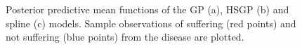 \documentclass[onecolumn,a4paper,11pt]{article}
\begin{document}
\begin{figure}
\caption{Posterior predictive mean functions of the GP (a), HSGP (b) and spline (c) models. Sample observations of suffering (red points) and not suffering (blue points) from the disease are plotted.}
  \label{ch5_fig18_gpfun_diabetes}
\end{figure}
\end{document}
